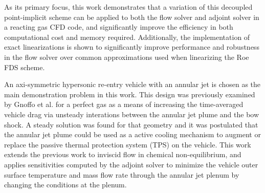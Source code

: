 As its primary focus, this work demonstrates that a variation of this decoupled
point-implicit scheme can be applied to both the flow solver and adjoint solver
in a reacting gas CFD code, and significantly improve the efficiency in both
computational cost and memory required.  Additionally, the implementation of
exact linearizations is shown to significantly improve performance and
robustness in the flow solver over common approximations used when linearizing
the Roe FDS scheme.

An axi-symmetric hypersonic re-entry vehicle with an annular jet is chosen as
the main demonstration problem in this work.  This design was previously
examined by Gnoffo et al.\cite{gnoffo2016tapping} for a perfect gas as a means
of increasing the time-averaged vehicle drag via unsteady interations between
the annular jet plume and the bow shock.  A steady solution was found for that
geometry and it was postulated that the annular jet plume could be used as a
active cooling mechanism to augment or replace the passive thermal protection
system (TPS) on the vehicle.  This work extends the previous work to inviscid
flow in chemical non-equilibrium, and applies sensitivities computed by the
adjoint solver to minimize the vehicle outer surface temperature and mass flow
rate through the annular jet plenum by changing the conditions at the plenum.


